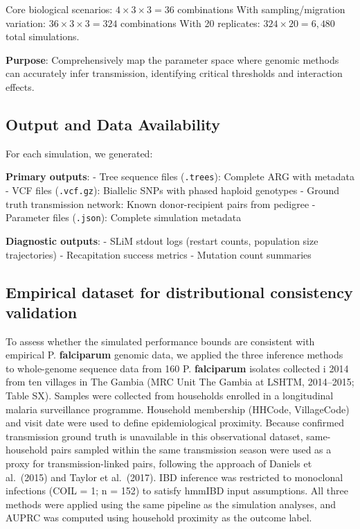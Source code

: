 \documentclass[
  11pt,
]{article}
\begin{document}
Core biological scenarios: \(4 \times 3 \times 3 = 36\) combinations
With sampling/migration variation: \(36 \times 3 \times 3 = 324\)
combinations With 20 replicates: \(324 \times 20 = 6,480\) total
simulations.

\textbf{Purpose}: Comprehensively map the parameter space where genomic
methods can accurately infer transmission, identifying critical
thresholds and interaction effects.

\subsection{Output and Data
Availability}\label{output-and-data-availability}

For each simulation, we generated:

\textbf{Primary outputs}: - Tree sequence files (\texttt{.trees}):
Complete ARG with metadata - VCF files (\texttt{.vcf.gz}): Biallelic
SNPs with phased haploid genotypes - Ground truth transmission network:
Known donor-recipient pairs from pedigree - Parameter files
(\texttt{.json}): Complete simulation metadata

\textbf{Diagnostic outputs}: - SLiM stdout logs (restart counts,
population size trajectories) - Recapitation success metrics - Mutation
count summaries

\subsection{Empirical dataset for distributional consistency
validation}\label{empirical-dataset-for-distributional-consistency-validation}

To assess whether the simulated performance bounds are consistent with
empirical P. \textbf{falciparum} genomic data, we applied the three
inference methods to whole-genome sequence data from 160 P.
\textbf{falciparum} isolates collected i 2014 from ten villages in The
Gambia (MRC Unit The Gambia at LSHTM, 2014--2015; Table SX). Samples
were collected from households enrolled in a longitudinal malaria
surveillance programme. Household membership (HHCode, VillageCode) and
visit date were used to define epidemiological proximity. Because
confirmed transmission ground truth is unavailable in this observational
dataset, same-household pairs sampled within the same transmission
season were used as a proxy for transmission-linked pairs, following the
approach of Daniels et al.~(2015) and Taylor et al.~(2017). IBD
inference was restricted to monoclonal infections (COIL = 1; n = 152) to
satisfy hmmIBD input assumptions. All three methods were applied using
the same pipeline as the simulation analyses, and AUPRC was computed
using household proximity as the outcome label.
\end{document}
